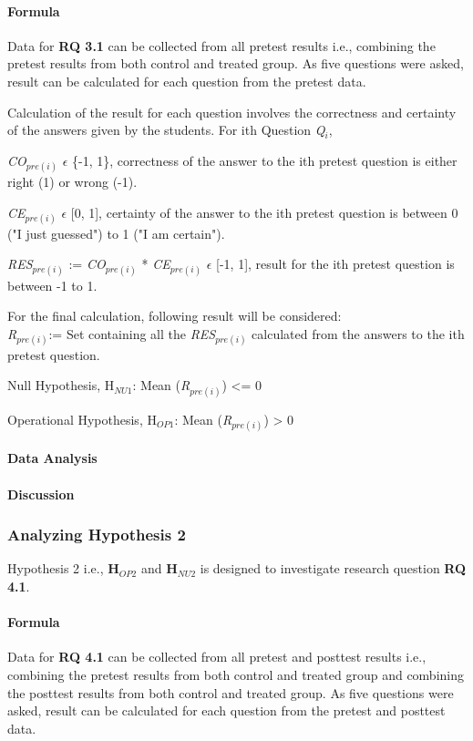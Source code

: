 \paragraph{Formula} Data for \textbf{RQ 3.1} can be collected from all pretest results i.e., combining the pretest results from both control and treated group. As five questions were asked, result can be calculated for each question from the pretest data. 

Calculation of the result for each question involves the correctness and certainty of the answers given by the students.
For ith Question \textit{Q$_{i}$},

\textit{CO$_{pre(i)}$} $\epsilon$ \{-1, 1\}, correctness of the answer to the ith pretest question is either right (1) or wrong (-1).

\textit{CE$_{pre(i)}$} $\epsilon$ [0, 1], certainty of the answer to the ith pretest question is between 0 ("I just guessed") to 1 ("I am certain").

\textit{RES$_{pre(i)}$} := \textit{CO$_{pre(i)}$} * \textit{CE$_{pre(i)}$} $\epsilon$ [-1,  1], result for the ith pretest question is between -1 to 1.

For the final calculation, following result will be considered:\\
\textit{R$_{pre(i)}$}:= Set containing all the \textit{RES$_{pre(i)}$} calculated from the answers to the ith pretest question.

Null Hypothesis, {H$_{NU1}$}: Mean (\textit{R$_{pre(i)}$}) <= 0

Operational Hypothesis, {H$_{OP1}$}: Mean (\textit{R$_{pre(i)}$}) > 0

\paragraph{Data Analysis}
\paragraph{Discussion}

\subsubsection{Analyzing Hypothesis 2}\label{subsubsec:hypothesis2}
Hypothesis 2 i.e., \textbf{H$_{OP2}$} and \textbf{H$_{NU2}$} is designed to investigate research question \textbf{RQ 4.1}.

\paragraph{Formula}
Data for \textbf{RQ 4.1} can be collected from all pretest and posttest results i.e., combining the pretest results from both control and treated group and combining the posttest results from both control and treated group. As five questions were asked, result can be calculated for each question from the pretest and posttest data. 

